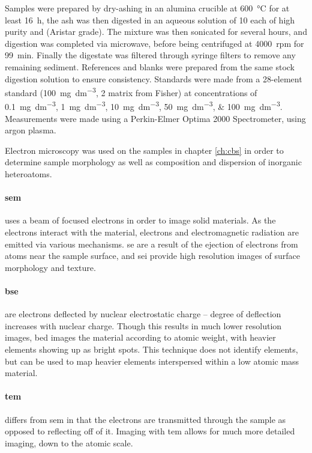 Samples were prepared by dry-ashing in an alumina crucible at \qty{600}{\degreeCelsius} for at least \qty{16}{\hour}, the ash was then digested in an aqueous solution of \qty{10}{\volpercent} each of high purity  and  (Aristar grade). The mixture was then sonicated for several hours, and digestion was completed via microwave, before being centrifuged at \qty{4000}{rpm} for \qty{99}{\minute}. Finally the digestate was filtered through syringe filters to remove any remaining sediment. References and blanks were prepared from the same stock digestion solution to ensure consistency. Standards were made from a 28-element standard (\qty{100}{\mg\per\dm\cubed}, \qty{2}{\volpercent}  matrix from Fisher) at concentrations of \qtylist[list-units = single]{0.1;1;10;50;100}{\mg\per\dm\cubed}. Measurements were made using a Perkin-Elmer Optima 2000 Spectrometer, using argon plasma.

Electron microscopy was used on the samples in chapter \ref{ch:cbs} in order to determine sample morphology as well as composition and dispersion of inorganic heteroatoms.

\paragraph{\acrfull{sem}} uses a beam of focused electrons in order to image solid materials. As the electrons interact with the material, electrons and electromagnetic radiation are emitted via various mechanisms. \Acrfull{se} are a result of the ejection of electrons from atoms near the sample surface, and \acrfull{sei} provide high resolution images of surface morphology and texture.\citep{Goldstein2017Scanning} 

\paragraph{\acrfull{bse}} are electrons deflected by nuclear electrostatic charge – degree of deflection increases with nuclear charge. Though this results in much lower resolution images, \acrfull{bed} images the material according to atomic weight, with heavier elements showing up as bright spots. This technique does not identify elements, but can be used to map heavier elements interspersed within a low atomic mass material.\citep{Goldstein2017Scanning}

\paragraph{\acrfull{tem}} differs from \acrshort{sem} in that the electrons are transmitted through the sample as opposed to reflecting off of it. Imaging with \acrshort{tem} allows for much more detailed imaging, down to the atomic scale.\citep{knoll1932elektronenmikroskop}

